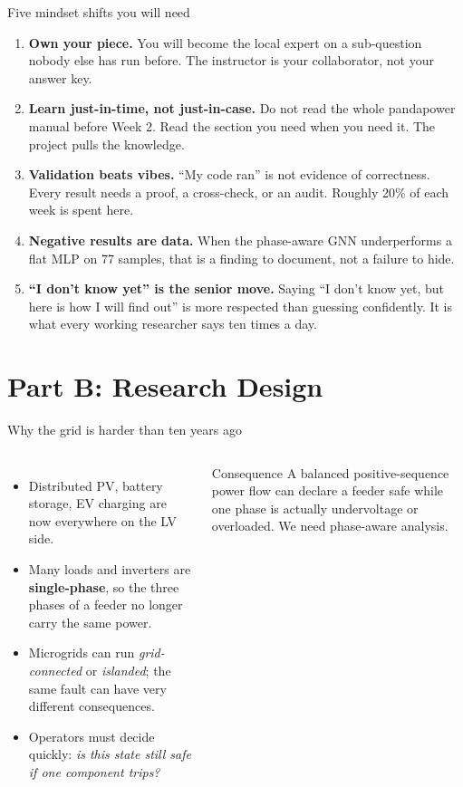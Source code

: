 \documentclass[aspectratio=169,10pt]{beamer}
\begin{document}
\begin{frame}{Five mindset shifts you will need}
\begin{enumerate}
  \item \textbf{Own your piece.} You will become the local expert on a sub-question nobody else has run before. The instructor is your collaborator, not your answer key.
  \vspace{0.15em}
  \item \textbf{Learn just-in-time, not just-in-case.} Do not read the whole pandapower manual before Week 2. Read the section you need when you need it. The project pulls the knowledge.
  \vspace{0.15em}
  \item \textbf{Validation beats vibes.} ``My code ran'' is not evidence of correctness. Every result needs a proof, a cross-check, or an audit. Roughly 20\% of each week is spent here.
  \vspace{0.15em}
  \item \textbf{Negative results are data.} When the phase-aware GNN underperforms a flat MLP on 77 samples, that is a finding to document, not a failure to hide.
  \vspace{0.15em}
  \item \textbf{``I don't know yet'' is the senior move.} Saying ``I don't know yet, but here is how I will find out'' is more respected than guessing confidently. It is what every working researcher says ten times a day.
\end{enumerate}
\end{frame}

\section*{Part B: Research Design}

\begin{frame}{Why the grid is harder than ten years ago}
\begin{columns}[T]
\begin{itemize}
  \item Distributed PV, battery storage, EV charging are now everywhere on the LV side.
  \item Many loads and inverters are \textbf{single-phase}, so the three phases of a feeder no longer carry the same power.
  \item Microgrids can run \emph{grid-connected} or \emph{islanded}; the same fault can have very different consequences.
  \item Operators must decide quickly: \emph{is this state still safe if one component trips?}
\end{itemize}
\begin{block}{Consequence}
A balanced positive-sequence power flow can declare a feeder safe while one phase is actually undervolt\-age or overloaded. We need phase-aware analysis.
\end{block}
\end{columns}
\end{frame}
\end{document}
